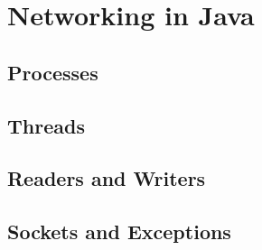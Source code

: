 \documentclass{scrartcl}
\begin{document}
\section{Networking in Java}
    \subsection{Processes}
    \subsection{Threads}
    \subsection{Readers and Writers}
    \subsection{Sockets and Exceptions}
   
\end{document}
